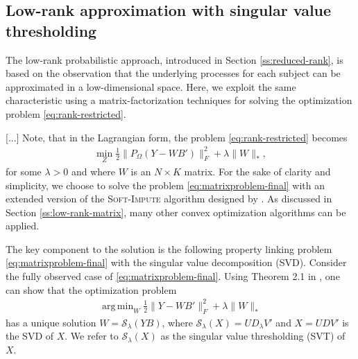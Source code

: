 \documentclass[preprint]{imsart}
\numberwithin{equation}{section}
\theoremstyle{plain}
\newcommand{\cS}{\mathcal{S}}
\DeclareMathOperator*{\argmin}{arg\,min}
\begin{document}
\subsection{Low-rank approximation with singular value thresholding}\label{ss:matrix-factorization}

The low-rank probabilistic approach, introduced in Section \ref{ss:reduced-rank}, is based on the observation that the underlying processes for each subject can be approximated in a low-dimensional space. %
Here, we exploit the same characteristic using a matrix-factorization techniques for solving the optimization problem \eqref{eq:rank-restricted}.

[...] Note, that in the Lagrangian form, the problem \eqref{eq:rank-restricted} becomes
\begin{align}\label{eq:matrixproblem-final}
\min_Z \frac{1}{2} \|P_\Omega(Y - WB')\|_F^2 + \lambda\|W\|_*,
\end{align}
for some $\lambda > 0$ and where $W$ is an $N \times K$ matrix. For the sake of clarity and simplicity, we choose to solve the problem \eqref{eq:matrixproblem-final} with an extended version of the \textsc{Soft-Impute} algorithm designed by \citet{mazumder2010spectral}. As discussed in Section \ref{ss:low-rank-matrix}, many other convex optimization algorithms can be applied.

The key component to the solution is the following property linking problem \eqref{eq:matrixproblem-final} with the singular value decomposition (SVD). Consider the fully observed case of \eqref{eq:matrixproblem-final}. Using Theorem 2.1 in \citet{cai2010singular}, one can show that the optimization problem
\begin{align}\label{eq:optsvd}
\argmin_{W} \frac{1}{2} \| Y - WB' \|_F^2 + \lambda\|W\|_*
\end{align}
has a unique solution $W = \cS_\lambda (YB)$, where $\cS_\lambda(X) = UD_\lambda V'$ and $X = UDV'$ is the SVD of $X$. We refer to $\cS_\lambda(X)$ as the singular value thresholding (SVT) of $X$.
\end{document}
